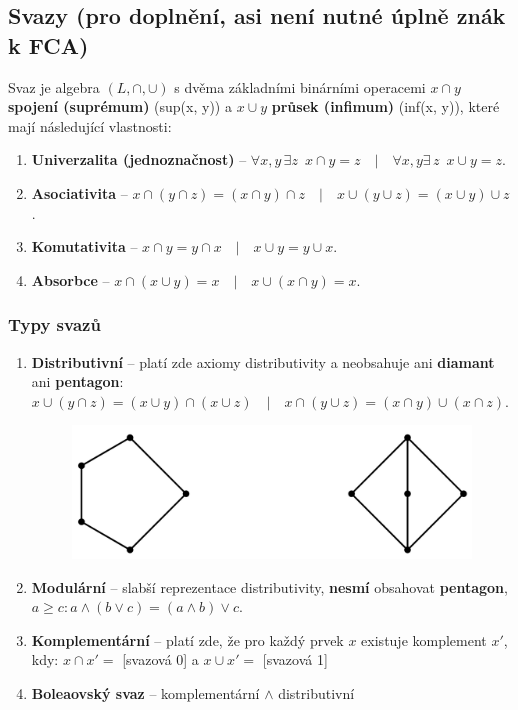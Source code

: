 \subsection{Svazy (pro doplnění, asi není nutné úplně znák k FCA)}
Svaz je algebra $(L, \cap, \cup)$ s dvěma základními binárními operacemi $x\cap{}y$ \textbf{spojení (suprémum)} (sup(x, y)) a $x\cup{}y$ \textbf{průsek (infimum)} (inf(x, y)), které mají následující vlastnosti:
\begin{enumerate}
\item \textbf{Univerzalita (jednoznačnost)} -- $\forall x,y \,\exists z \,\,\, x \cap y = z\quad|\quad\forall x,y \exists\, z \,\,\, x \cup y = z$.
\item \textbf{Asociativita} -- $x \cap (y \cap z) = (x \cap y) \cap z \quad|\quad x \cup (y \cup z) = (x \cup y) \cup z$.
\item \textbf{Komutativita} -- $x \cap y = y \cap x \quad|\quad x \cup y = y \cup x$.
\item \textbf{Absorbce} -- $x \cap (x \cup y) = x \quad|\quad x \cup (x \cap y) = x $.
\end{enumerate}

\subsubsection{Typy svazů}
\begin{enumerate}
\item \textbf{Distributivní} -- platí zde axiomy distributivity a neobsahuje ani \textbf{diamant} ani \textbf{pentagon}: $x \cup (y \cap z) = (x \cup y) \cap (x \cup z) \quad|\quad x \cap (y \cup z) = (x \cap y) \cup (x \cap z) $.

\begin{figure}[H]
	\centering
	\includegraphics[width=.4\textwidth]{assets/pentagon_diamant}
\end{figure}
\item \textbf{Modulární} -- slabší reprezentace distributivity, \textbf{nesmí} obsahovat \textbf{pentagon}, $a \geq c: a \land (b \lor c) = (a \land b) \lor c$.
\item \textbf{Komplementární} -- platí zde, že pro každý prvek $ x $ existuje komplement $x' $, kdy: $x \cap x' = $ [svazová 0] a $x \cup x' = $ [svazová 1]
\item \textbf{Boleaovský svaz} -- komplementární $\land$ distributivní
\end{enumerate}

